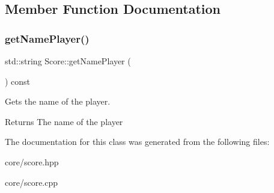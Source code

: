 \subsection{Member Function Documentation}
\mbox{\label{class_score_ab84d1934f656ed3d6486fdab859a055c}} 
\subsubsection{\texorpdfstring{get\+Name\+Player()}{getNamePlayer()}}
{\footnotesize\ttfamily std\+::string Score\+::get\+Name\+Player (\begin{DoxyParamCaption}{ }\end{DoxyParamCaption}) const\hspace{0.3cm}{\ttfamily [inline]}}



Gets the name of the player. 

\begin{DoxyReturn}{Returns}
The name of the player 
\end{DoxyReturn}


The documentation for this class was generated from the following files\+:\begin{DoxyCompactItemize}
\item 
core/score.\+hpp\item 
core/score.\+cpp\end{DoxyCompactItemize}
